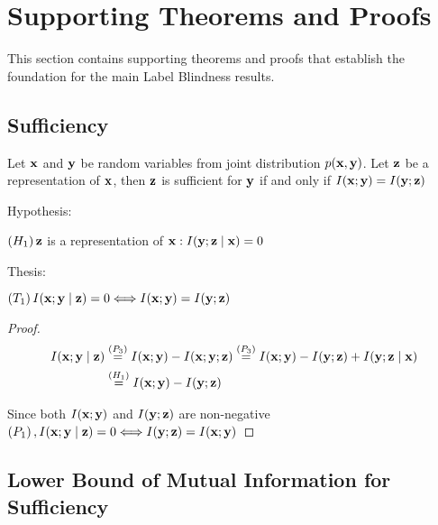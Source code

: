 \section{Supporting Theorems and Proofs}
\label{app:supporting}

This section contains supporting theorems and proofs that establish the foundation for the main Label Blindness results.

\subsection{Sufficiency}
\label{app:sufficiency}

\begin{proposition}
Let ${\mathbf{x}}$ and ${\mathbf{y}}$ be random variables from joint distribution $p({\mathbf{x}}, {\mathbf{y}})$. Let ${\mathbf{z}}$ be a representation of ${\mathbf{x}}$, then ${\mathbf{z}}$ is sufficient for ${\mathbf{y}}$ if and only if $I({\mathbf{x}} ; {\mathbf{y}})=I({\mathbf{y}} ; {\mathbf{z}})$

Hypothesis:

$\left(H_1\right) {\mathbf{z}}$ is a representation of ${\mathbf{x}}: I({\mathbf{y}} ; {\mathbf{z}} \mid {\mathbf{x}})=0$

Thesis:

$\left(T_1\right) I({\mathbf{x}} ; {\mathbf{y}} \mid {\mathbf{z}})=0 \Longleftrightarrow I({\mathbf{x}} ; {\mathbf{y}})=I({\mathbf{y}} ; {\mathbf{z}})$

\begin{proof}
$$
\begin{aligned}
I({\mathbf{x}} ; {\mathbf{y}} \mid {\mathbf{z}}) & \stackrel{\left(P_3\right)}{=} I({\mathbf{x}} ; {\mathbf{y}})-I({\mathbf{x}} ; {\mathbf{y}} ; {\mathbf{z}}) \stackrel{\left(P_3\right)}{=} I({\mathbf{x}} ; {\mathbf{y}})-I({\mathbf{y}} ; {\mathbf{z}})+I({\mathbf{y}} ; {\mathbf{z}} \mid {\mathbf{x}}) \\
& \stackrel{\left(H_1\right)}{=} I({\mathbf{x}} ; {\mathbf{y}})-I({\mathbf{y}} ; {\mathbf{z}})
\end{aligned}
$$

Since both $I({\mathbf{x}} ; {\mathbf{y}})$ and $I({\mathbf{y}} ; {\mathbf{z}})$ are non-negative $\left(P_1\right), I({\mathbf{x}} ; {\mathbf{y}} \mid {\mathbf{z}})=0 \Longleftrightarrow I({\mathbf{y}} ; {\mathbf{z}})=I({\mathbf{x}} ; {\mathbf{y}})$

\end{proof}
\label{sufficiency}
\end{proposition}

\subsection{Lower Bound of Mutual Information for Sufficiency}
\label{app:infobound}

